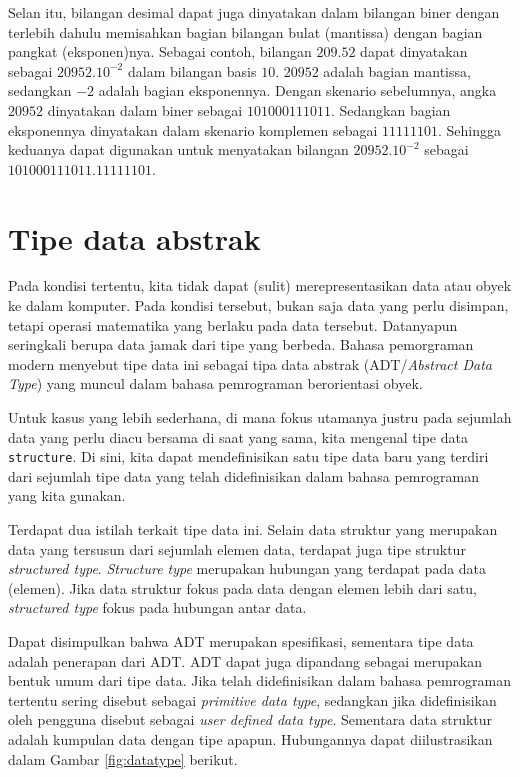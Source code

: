 Selan itu, bilangan desimal dapat juga dinyatakan dalam bilangan biner dengan terlebih dahulu memisahkan bagian bilangan bulat (mantissa) dengan bagian pangkat (eksponen)nya. Sebagai contoh, bilangan $209.52$ dapat dinyatakan sebagai $20952.10^{-2}$ dalam bilangan basis $10$. $20952$ adalah bagian mantissa, sedangkan $-2$ adalah bagian eksponennya. Dengan skenario sebelumnya, angka $20952$ dinyatakan dalam biner sebagai $101000111011$. Sedangkan bagian eksponennya dinyatakan dalam skenario komplemen sebagai $11111101$. Sehingga keduanya dapat digunakan untuk menyatakan bilangan $20952.10^{-2}$ sebagai $101000111011$.$11111101$.

\section{Tipe data abstrak}
Pada kondisi tertentu, kita tidak dapat (sulit) merepresentasikan data atau obyek ke dalam komputer. Pada kondisi tersebut, bukan saja data yang perlu disimpan, tetapi operasi matematika yang berlaku pada data tersebut. Datanyapun seringkali berupa data jamak dari tipe yang berbeda. Bahasa pemorgraman modern menyebut tipe data ini sebagai tipa data abstrak (ADT/\textit{Abstract Data Type}) yang muncul dalam bahasa pemrograman berorientasi obyek.

Untuk kasus yang lebih sederhana, di mana fokus utamanya justru pada sejumlah data yang perlu diacu bersama di saat yang sama, kita mengenal tipe data \texttt{structure}. Di sini, kita dapat mendefinisikan satu tipe data baru yang terdiri dari sejumlah tipe data yang telah didefinisikan dalam bahasa pemrograman yang kita gunakan. 

Terdapat dua istilah terkait tipe data ini. Selain data struktur yang merupakan data yang tersusun dari sejumlah elemen data, terdapat juga tipe struktur \textit{structured type}. \textit{Structure type} merupakan hubungan yang terdapat pada data (elemen). Jika data struktur fokus pada data dengan elemen lebih dari satu, \textit{structured type} fokus pada hubungan antar data.

Dapat disimpulkan bahwa ADT merupakan spesifikasi, sementara tipe data adalah penerapan dari ADT. ADT dapat juga dipandang sebagai merupakan bentuk umum dari tipe data. Jika telah didefinisikan dalam bahasa pemrograman tertentu sering disebut sebagai \textit{primitive data type}, sedangkan jika didefinisikan oleh pengguna disebut sebagai \textit{user defined data type}. Sementara data struktur adalah kumpulan data dengan tipe apapun. Hubungannya dapat diilustrasikan dalam Gambar \ref{fig:datatype} berikut.

